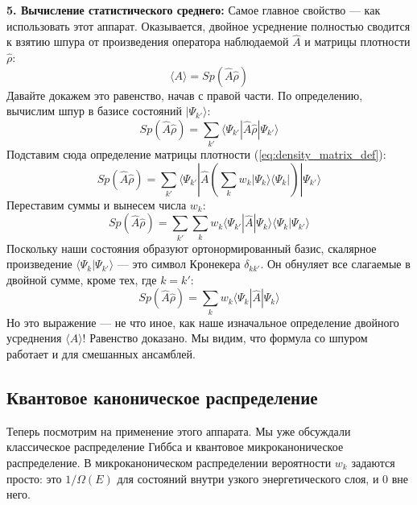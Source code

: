\documentclass[../general/general]{subfiles}
\begin{document}
\textbf{5. Вычисление статистического среднего:}
Самое главное свойство — как использовать этот аппарат. Оказывается, двойное усреднение полностью сводится к взятию шпура от произведения оператора наблюдаемой $\hat{A}$ и матрицы плотности $\hat{\rho}$:
\begin{equation}
    \langle A \rangle = Sp(\hat{A}\hat{\rho})
\end{equation}
Давайте докажем это равенство, начав с правой части. По определению, вычислим шпур в базисе состояний $|\Psi_{k'}\rangle$:
\begin{equation}
    Sp(\hat{A}\hat{\rho}) = \sum_{k'} \langle \Psi_{k'} | \hat{A} \hat{\rho} | \Psi_{k'} \rangle
\end{equation}
Подставим сюда определение матрицы плотности (\ref{eq:density_matrix_def}):
\begin{equation}
    Sp(\hat{A}\hat{\rho}) = \sum_{k'} \langle \Psi_{k'} | \hat{A} \left( \sum_k w_k |\Psi_k\rangle \langle \Psi_k | \right) | \Psi_{k'} \rangle
\end{equation}
Переставим суммы и вынесем числа $w_k$:
\begin{equation}
    Sp(\hat{A}\hat{\rho}) = \sum_{k'} \sum_k w_k \langle \Psi_{k'} | \hat{A} | \Psi_k \rangle \langle \Psi_k | \Psi_{k'} \rangle
\end{equation}
Поскольку наши состояния образуют ортонормированный базис, скалярное произведение $\langle \Psi_k | \Psi_{k'} \rangle$ — это символ Кронекера $\delta_{kk'}$. Он обнуляет все слагаемые в двойной сумме, кроме тех, где $k = k'$:
\begin{equation}
    Sp(\hat{A}\hat{\rho}) = \sum_k w_k \langle \Psi_k | \hat{A} | \Psi_k \rangle
\end{equation}
Но это выражение — не что иное, как наше изначальное определение двойного усреднения $\langle A \rangle$! Равенство доказано. Мы видим, что формула со шпуром работает и для смешанных ансамблей.

\subsection{Квантовое каноническое распределение}

Теперь посмотрим на применение этого аппарата. Мы уже обсуждали классическое распределение Гиббса и квантовое микроканоническое распределение. В микроканоническом распределении вероятности $w_k$ задаются просто: это $1/\Omega(E)$ для состояний внутри узкого энергетического слоя, и $0$ вне него. 
\end{document}
